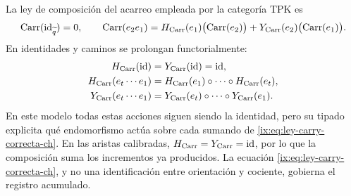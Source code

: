 La ley de composición del acarreo empleada por la categoría TPK es
\begin{equation}
 \operatorname{Carr}(\operatorname{id}_{\widetilde q})=0,\qquad
 \operatorname{Carr}(e_2e_1)
 =H_{\rm Carr}(e_1)\bigl(\operatorname{Carr}(e_2)\bigr)
  +Y_{\rm Carr}(e_2)\bigl(\operatorname{Carr}(e_1)\bigr).
 \label{ix:eq:ley-carry-correcta-ch}
\end{equation}
En identidades y caminos se prolongan functorialmente:
\[
\begin{aligned}
 H_{\rm Carr}(\operatorname{id})
   &=Y_{\rm Carr}(\operatorname{id})=\operatorname{id},\\
 H_{\rm Carr}(e_t\cdots e_1)
   &=H_{\rm Carr}(e_1)\circ\cdots\circ H_{\rm Carr}(e_t),\\
 Y_{\rm Carr}(e_t\cdots e_1)
   &=Y_{\rm Carr}(e_t)\circ\cdots\circ Y_{\rm Carr}(e_1).
\end{aligned}
\]
En este modelo todas estas acciones siguen siendo la identidad, pero
su tipado explicita qué endomorfismo actúa sobre cada sumando de
\eqref{ix:eq:ley-carry-correcta-ch}.
En las aristas calibradas, \(H_{\rm Carr}=Y_{\rm Carr}=\operatorname{id}\),
por lo que la composición suma los incrementos ya producidos. La ecuación
\eqref{ix:eq:ley-carry-correcta-ch}, y no una identificación entre orientación y
cociente, gobierna el registro acumulado.

